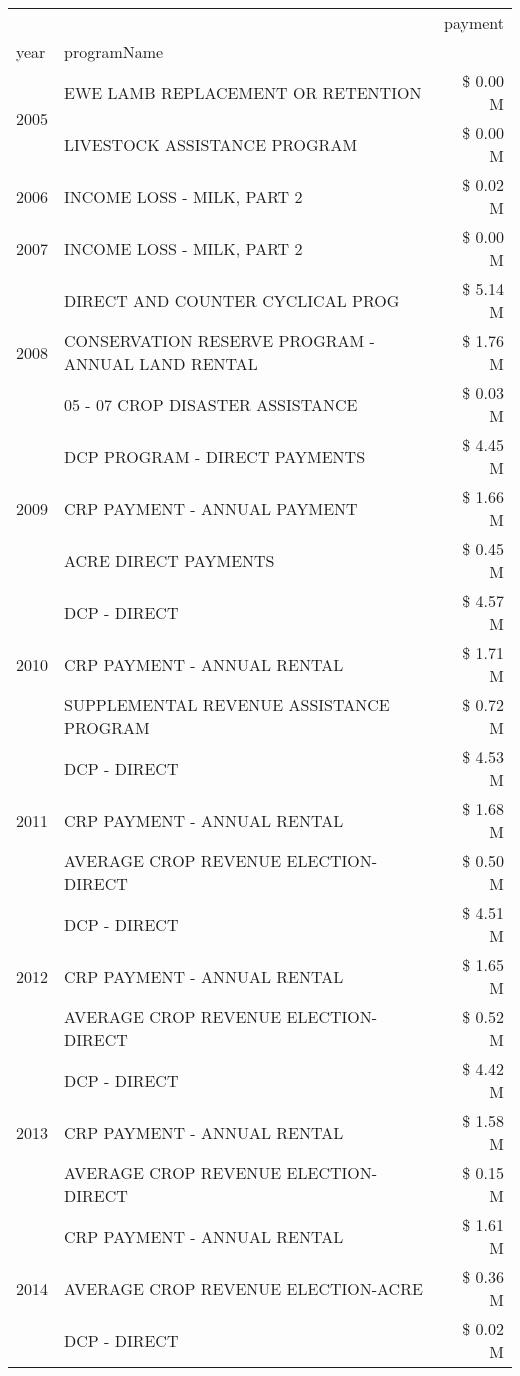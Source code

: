 \begin{tabular}{llr}
\toprule
 &  & payment \\
year & programName &  \\
\midrule
\multirow[t]{2}{*}{2005} & EWE LAMB REPLACEMENT OR RETENTION & \$ 0.00 M \\
 & LIVESTOCK ASSISTANCE PROGRAM & \$ 0.00 M \\
\cline{1-3}
2006 & INCOME LOSS - MILK, PART 2 & \$ 0.02 M \\
\cline{1-3}
2007 & INCOME LOSS - MILK, PART 2 & \$ 0.00 M \\
\cline{1-3}
\multirow[t]{3}{*}{2008} & DIRECT AND COUNTER CYCLICAL PROG & \$ 5.14 M \\
 & CONSERVATION RESERVE PROGRAM - ANNUAL LAND RENTAL & \$ 1.76 M \\
 & 05 - 07 CROP DISASTER ASSISTANCE & \$ 0.03 M \\
\cline{1-3}
\multirow[t]{3}{*}{2009} & DCP PROGRAM - DIRECT PAYMENTS & \$ 4.45 M \\
 & CRP PAYMENT - ANNUAL PAYMENT & \$ 1.66 M \\
 & ACRE DIRECT PAYMENTS & \$ 0.45 M \\
\cline{1-3}
\multirow[t]{3}{*}{2010} & DCP - DIRECT & \$ 4.57 M \\
 & CRP PAYMENT - ANNUAL RENTAL & \$ 1.71 M \\
 & SUPPLEMENTAL REVENUE ASSISTANCE PROGRAM & \$ 0.72 M \\
\cline{1-3}
\multirow[t]{3}{*}{2011} & DCP - DIRECT & \$ 4.53 M \\
 & CRP PAYMENT - ANNUAL RENTAL & \$ 1.68 M \\
 & AVERAGE CROP REVENUE ELECTION-DIRECT & \$ 0.50 M \\
\cline{1-3}
\multirow[t]{3}{*}{2012} & DCP - DIRECT & \$ 4.51 M \\
 & CRP PAYMENT - ANNUAL RENTAL & \$ 1.65 M \\
 & AVERAGE CROP REVENUE ELECTION-DIRECT & \$ 0.52 M \\
\cline{1-3}
\multirow[t]{3}{*}{2013} & DCP - DIRECT & \$ 4.42 M \\
 & CRP PAYMENT - ANNUAL RENTAL & \$ 1.58 M \\
 & AVERAGE CROP REVENUE ELECTION-DIRECT & \$ 0.15 M \\
\cline{1-3}
\multirow[t]{3}{*}{2014} & CRP PAYMENT - ANNUAL RENTAL & \$ 1.61 M \\
 & AVERAGE CROP REVENUE ELECTION-ACRE & \$ 0.36 M \\
 & DCP - DIRECT & \$ 0.02 M \\

\end{tabular}
